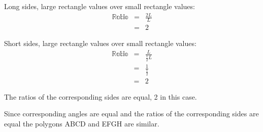 \documentclass[10pt,a4paper,titlepage,twoside,openright]{report}
\begin{document}
\begin{wex}
{Long sides, large rectangle values over small rectangle values:
\begin{eqnarray*}
 \mathbb{Ratio} & = & \frac{2L}{L} \\
& = & 2
\end{eqnarray*}

Short sides, large rectangle values over small rectangle values:
\begin{eqnarray*}
 \mathbb{Ratio} & = & \frac{L}{\frac{1}{2}L} \\
 & = & \frac{1}{\frac{1}{2}} \\
& = & 2
\end{eqnarray*}

The ratios of the corresponding sides are equal, 2 in this case.

Since corresponding angles are equal and the ratios of the corresponding sides are equal the polygons ABCD and EFGH are similar.}
\end{wex}

\end{document}
